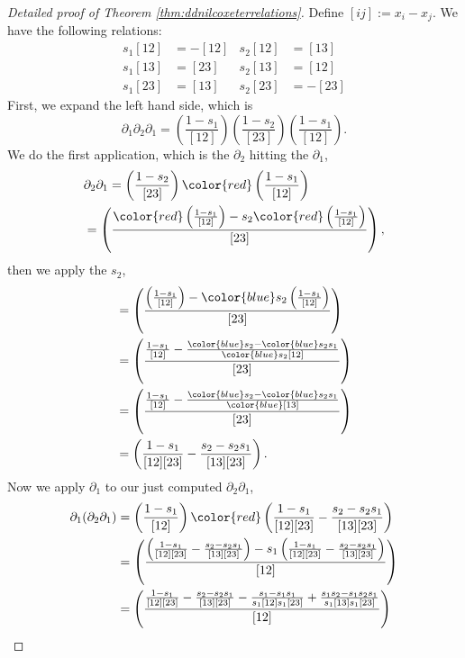\documentclass{article}
\begin{document}
\begin{proof}[Detailed proof of Theorem \ref{thm:ddnilcoxeterrelations}] 
    Define $[ij] := x_i - x_j$.
    We have the following relations:
    \begin{align*}
        s_1[12] &= -[12] & s_2[12] &= [13] \\
        s_1[13] &= [23] & s_2[13] &= [12] \\
        s_1[23] &= [13] & s_2[23] &= -[23]
    \end{align*}
    First, we expand the left hand side, which is
    \[
        \partial_1\partial_2\partial_1 = \left(\frac{1 - s_1}{[12]}\right)\left(\frac{1 - s_2}{[23]}\right)\left(\frac{1 - s_1}{[12]}\right).
    \]
    We do the first application, which is the $\partial_2$ hitting the $\partial_1$,
    \begin{align*}
        &\partial_2\partial_1 = \left(\frac{1 - s_2}{[23]}\right) {\color{red} \left(\frac{1 - s_1}{[12]}\right)} \\
        &= \left(\frac{{\color{red}\left(\frac{1 - s_1}{[12]}\right)} - s_2{\color{red}\left(\frac{1 - s_1}{[12]}\right)}}{[23]}\right),
    \end{align*}
    then we apply the $s_2$,
    \begin{align*}
        &= \left(\frac{\left(\frac{1 - s_1}{[12]}\right) - {\color{blue}s_2}\left(\frac{1 - s_1}{[12]}\right)}{[23]}\right) \\
        &= \left(\frac{\frac{1 - s_1}{[12]} - \frac{{\color{blue}s_2} - {\color{blue}s_2}s_1}{{\color{blue} s_2}[12]}}{[23]}\right) \\
        &= \left(\frac{\frac{1 - s_1}{[12]} - \frac{{\color{blue}s_2} - {\color{blue}s_2}s_1}{\color{blue}[13]}}{[23]}\right) \\
        &= \left(\frac{1 - s_1}{[12][23]} - \frac{s_2 - s_2s_1}{[13][23]}\right).
    \end{align*}
    Now we apply $\partial_1$ to our just computed $\partial_2\partial_1$,
    \begin{align*}
        \partial_1(\partial_2\partial_1)
        &= \left(\frac{1 - s_1}{[12]}\right){\color{red}\left(\frac{1 - s_1}{[12][23]} - \frac{s_2 - s_2s_1}{[13][23]}\right)} \\
        &= \left(\frac{\left(\frac{1 - s_1}{[12][23]} - \frac{s_2 - s_2s_1}{[13][23]}\right) - s_1\left(\frac{1 - s_1}{[12][23]} - \frac{s_2 - s_2s_1}{[13][23]}\right)}{[12]}\right) \\
        &= \left(\frac{\frac{1 - s_1}{[12][23]} - \frac{s_2 - s_2s_1}{[13][23]} - \frac{s_1 - s_1s_1}{s_1[12]s_1[23]} + \frac{s_1s_2 - s_1s_2s_1}{s_1[13]s_1[23]}}{[12]}\right) \\

\end{align*}
\end{proof}
\end{document}
